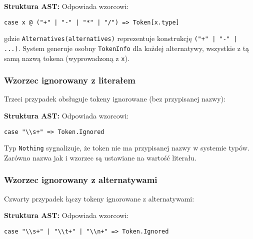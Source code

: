 

\textbf{Struktura AST:} Odpowiada wzorcowi:
\begin{lstlisting}
case x @ ("+" | "-" | "*" | "/") => Token[x.type]
\end{lstlisting}

gdzie \texttt{Alternatives(alternatives)} reprezentuje konstrukcję \texttt{("+" | "-" | ...)}. System generuje osobny \texttt{TokenInfo} dla każdej alternatywy, wszystkie z tą samą nazwą tokena (wyprowadzoną z \texttt{x}).

\subsubsection{Wzorzec ignorowany z literałem}
\label{subsubsec:cnp-ignored-literal}

Trzeci przypadek obsługuje tokeny ignorowane (bez przypisanej nazwy):



\textbf{Struktura AST:} Odpowiada wzorcowi:
\begin{lstlisting}
case "\\s+" => Token.Ignored
\end{lstlisting}

Typ \texttt{Nothing} sygnalizuje, że token nie ma przypisanej nazwy w systemie typów. Zarówno nazwa jak i wzorzec są ustawiane na wartość literału.

\subsubsection{Wzorzec ignorowany z alternatywami}
\label{subsubsec:cnp-ignored-alternatives}

Czwarty przypadek łączy tokeny ignorowane z alternatywami:



\textbf{Struktura AST:} Odpowiada wzorcowi:
\begin{lstlisting}
case "\\s+" | "\\t+" | "\\n+" => Token.Ignored
\end{lstlisting}

